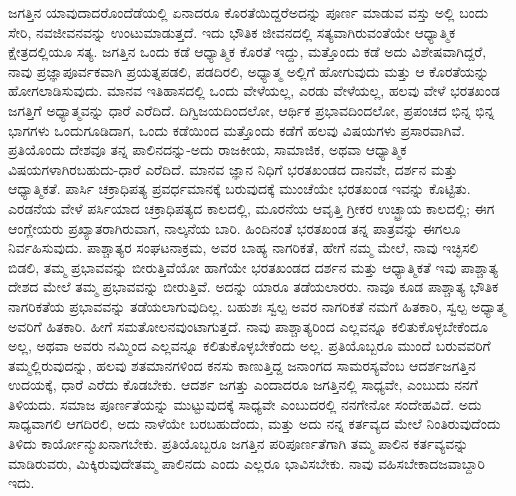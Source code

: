 ಜಗತ್ತಿನ ಯಾವುದಾದರೊಂದೆಡೆಯಲ್ಲಿ ಏನಾದರೂ ಕೊರತೆಯಿದ್ದರೆ\break ಅದನ್ನು ಪೂರ್ಣ ಮಾಡುವ ವಸ್ತು ಅಲ್ಲಿ ಬಂದು ಸೇರಿ, ನವಜೀವನವನ್ನು ಉಂಟುಮಾಡುತ್ತದೆ. ಇದು ಭೌತಿಕ ಜೀವನದಲ್ಲಿ ಸತ್ಯವಾಗಿರುವಂತೆಯೇ ಆಧ್ಯಾತ್ಮಿಕ ಕ್ಷೇತ್ರದಲ್ಲಿಯೂ ಸತ್ಯ. ಜಗತ್ತಿನ ಒಂದು ಕಡೆ ಆಧ್ಯಾತ್ಮಿಕ ಕೊರತೆ ಇದ್ದು, ಮತ್ತೊಂದು ಕಡೆ ಅದು ವಿಶೇಷವಾಗಿದ್ದರೆ, ನಾವು ಪ್ರಜ್ಞಾಪೂರ್ವಕವಾಗಿ ಪ್ರಯತ್ನಪಡಲಿ, ಪಡದಿರಲಿ, ಅಧ್ಯಾತ್ಮ ಅಲ್ಲಿಗೆ ಹೋಗುವುದು ಮತ್ತು ಆ ಕೊರತೆಯನ್ನು ಹೋಗಲಾಡಿಸುವುದು. ಮಾನವ ಇತಿಹಾಸದಲ್ಲಿ ಒಂದು ವೇಳೆಯಲ್ಲ, ಎರಡು ವೇಳೆಯಲ್ಲ, ಹಲವು ವೇಳೆ ಭರತಖಂಡ ಜಗತ್ತಿಗೆ ಅಧ್ಯಾತ್ಮವನ್ನು ಧಾರೆ ಎರೆದಿದೆ. ದಿಗ್ವಿಜಯದಿಂದಲೋ, ಆರ್ಥಿಕ ಪ್ರಭಾವದಿಂದಲೋ, ಪ್ರಪಂಚದ ಭಿನ್ನ ಭಿನ್ನ ಭಾಗಗಳು ಒಂದುಗೂಡಿದಾಗ, ಒಂದು ಕಡೆಯಿಂದ ಮತ್ತೊಂದು ಕಡೆಗೆ ಹಲವು ವಿಷಯಗಳು ಪ್ರಸಾರವಾಗಿವೆ. ಪ್ರತಿಯೊಂದು ದೇಶವೂ ತನ್ನ ಪಾಲಿನದನ್ನು-ಅದು ರಾಜಕೀಯ, ಸಾಮಾಜಿಕ, ಅಥವಾ ಆಧ್ಯಾತ್ಮಿಕ ವಿಷಯಗಳಾಗಿರಬಹುದು-ಧಾರೆ ಎರೆದಿದೆ. ಮಾನವ ಜ್ಞಾನ ನಿಧಿಗೆ ಭರತಖಂಡದ ದಾನವೇ, ದರ್ಶನ ಮತ್ತು ಆಧ್ಯಾತ್ಮಿಕತೆ. ಪಾರ್ಸಿ ಚಕ್ರಾಧಿಪತ್ಯ ಪ್ರವರ್ಧಮಾನಕ್ಕೆ ಬರುವುದಕ್ಕೆ ಮುಂಚೆಯೇ ಭರತಖಂಡ ಇವನ್ನು ಕೊಟ್ಟಿತು. ಎರಡನೆಯ ವೇಳೆ ಪರ್ಸಿಯಾದ ಚಕ್ರಾಧಿಪತ್ಯದ ಕಾಲದಲ್ಲಿ, ಮೂರನೆಯ ಆವೃತ್ತಿ ಗ್ರೀಕರ ಉಚ್ಛ್ರಾಯ ಕಾಲದಲ್ಲಿ; ಈಗ ಆಂಗ್ಲೇಯರು ಪ್ರಖ್ಯಾತರಾಗಿರುವಾಗ, ನಾಲ್ಕನೆಯ ಬಾರಿ. ಹಿಂದಿನಂತೆ ಭರತಖಂಡ ತನ್ನ ಪಾತ್ರವನ್ನು ಈಗಲೂ ನಿರ್ವಹಿಸುವುದು. ಪಾಶ್ಚಾತ್ಯರ ಸಂಘಟನಾಕ್ರಮ, ಅವರ ಬಾಹ್ಯ ನಾಗರಿಕತೆ, ಹೇಗೆ ನಮ್ಮ ಮೇಲೆ, ನಾವು ಇಚ್ಛಿಸಲಿ ಬಿಡಲಿ, ತಮ್ಮ ಪ್ರಭಾವವನ್ನು ಬೀರು\-ತ್ತಿವೆಯೋ ಹಾಗೆಯೇ ಭರತಖಂಡದ ದರ್ಶನ ಮತ್ತು ಆಧ್ಯಾತ್ಮಿಕತೆ ಇವು ಪಾಶ್ಚಾತ್ಯ ದೇಶದ ಮೇಲೆ ತಮ್ಮ ಪ್ರಭಾವವನ್ನು ಬೀರುತ್ತಿವೆ. ಅದನ್ನು ಯಾರೂ ತಡೆಯಲಾರರು. ನಾವೂ ಕೂಡ ಪಾಶ್ಚಾತ್ಯ ಭೌತಿಕ ನಾಗರಿಕತೆಯ ಪ್ರಭಾವವನ್ನು ತಡೆಯಲಾಗುವುದಿಲ್ಲ. ಬಹುಶಃ ಸ್ವಲ್ಪ ಅವರ ನಾಗರಿಕತೆ ನಮಗೆ ಹಿತಕಾರಿ, ಸ್ವಲ್ಪ ಅಧ್ಯಾತ್ಮ ಅವರಿಗೆ ಹಿತಕಾರಿ. ಹೀಗೆ ಸಮತೋಲನವುಂಟಾಗುತ್ತದೆ. ನಾವು ಪಾಶ್ಚಾತ್ಯರಿಂದ ಎಲ್ಲವನ್ನೂ ಕಲಿತುಕೊಳ್ಳಬೇಕೆಂದೂ ಅಲ್ಲ, ಅಥವಾ ಅವರು ನಮ್ಮಿಂದ ಎಲ್ಲವನ್ನೂ ಕಲಿತುಕೊಳ್ಳಬೇಕೆಂದು ಅಲ್ಲ. ಪ್ರತಿಯೊಬ್ಬರೂ ಮುಂದೆ ಬರುವವರಿಗೆ ತಮ್ಮಲ್ಲಿರುವುದನ್ನು, ಹಲವು ಶತಮಾನಗಳಿಂದ ಕನಸು ಕಾಣುತ್ತಿದ್ದ ಜನಾಂಗದ ಸಾಮರಸ್ಯವೆಂಬ ಆದರ್ಶಜಗತ್ತಿನ ಉದಯಕ್ಕೆ, ಧಾರೆ ಎರೆದು ಕೊಡಬೇಕು. ಆದರ್ಶ ಜಗತ್ತು ಎಂದಾದರೂ ಜಗತ್ತಿನಲ್ಲಿ ಸಾಧ್ಯವೇ, ಎಂಬುದು ನನಗೆ ತಿಳಿಯದು. ಸಮಾಜ ಪೂರ್ಣತೆಯನ್ನು ಮುಟ್ಟುವುದಕ್ಕೆ ಸಾಧ್ಯವೇ ಎಂಬುದರಲ್ಲಿ ನನಗೇನೋ ಸಂದೇಹವಿದೆ. ಅದು ಸಾಧ್ಯವಾಗಲಿ ಆಗದಿರಲಿ, ಅದು ನಾಳೆಯೇ ಬರಬಹುದೆಂದು, ಮತ್ತು ಅದು ನನ್ನ ಕರ್ತವ್ಯದ ಮೇಲೆ ನಿಂತಿರುವುದೆಂದು ತಿಳಿದು ಕಾರ್ಯೋನ್ಮುಖನಾಗಬೇಕು. ಪ್ರತಿಯೊಬ್ಬರೂ ಜಗತ್ತಿನ ಪರಿಪೂರ್ಣತೆಗಾಗಿ ತಮ್ಮ ಪಾಲಿನ ಕರ್ತವ್ಯವನ್ನು ಮಾಡಿರುವರು, ಮಿಕ್ಕಿರುವುದೇ\break ತಮ್ಮ ಪಾಲಿನದು ಎಂದು ಎಲ್ಲರೂ ಭಾವಿಸಬೇಕು. ನಾವು ವಹಿಸಬೇಕಾದ\break ಜವಾಬ್ದಾರಿ ಇದು.

